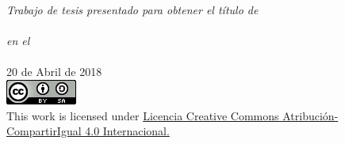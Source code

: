 \documentclass[
11pt, %
english, %
onehalfspacing, %
nolistspacing, %
headsepline, %
consistentlayout, %
]{MastersDoctoralThesis} %
\begin{document}
\begin{titlepage}
\begin{center}
\large \textit{Trabajo de tesis presentado para obtener el título de\\  \degreename}\\[0.2cm] %
\textit{en el}\\[0.2cm]
\groupname\\[0.5cm]%

{\large 20 de Abril de 2018}\\[0.5cm] %

\includegraphics[scale=0.75]{images/cc-by-sa.png}\\
{\small This work is licensed under
\href{http://creativecommons.org/licenses/by-sa/4.0/}{Licencia Creative Commons Atribución-CompartirIgual 4.0 Internacional.}}


 
 

\end{center}
\end{titlepage}
\end{document}
